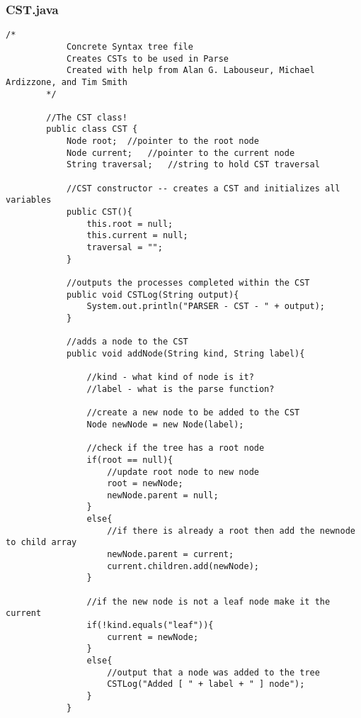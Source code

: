 \documentclass[letterpaper, 10pt,DIV=13]{scrartcl}
\numberwithin{equation}{section} %
\numberwithin{figure}{section} %
\numberwithin{table}{section} %
\begin{document}
    \subsubsection*{CST.java}
    \lstset{numbers=left, numberstyle=\tiny, stepnumber=1, numbersep=5pt, basicstyle=\footnotesize\ttfamily}
    \begin{lstlisting}[frame=single, ]
        /*
            Concrete Syntax tree file
            Creates CSTs to be used in Parse
            Created with help from Alan G. Labouseur, Michael Ardizzone, and Tim Smith
        */
        
        //The CST class!
        public class CST {
            Node root;  //pointer to the root node
            Node current;   //pointer to the current node
            String traversal;   //string to hold CST traversal
        
            //CST constructor -- creates a CST and initializes all variables
            public CST(){
                this.root = null;
                this.current = null;
                traversal = "";
            }
        
            //outputs the processes completed within the CST
            public void CSTLog(String output){
                System.out.println("PARSER - CST - " + output);
            }
        
            //adds a node to the CST
            public void addNode(String kind, String label){
        
                //kind - what kind of node is it?
                //label - what is the parse function?
        
                //create a new node to be added to the CST
                Node newNode = new Node(label);
        
                //check if the tree has a root node
                if(root == null){
                    //update root node to new node
                    root = newNode;
                    newNode.parent = null;
                }
                else{
                    //if there is already a root then add the newnode to child array
                    newNode.parent = current;
                    current.children.add(newNode);
                }
        
                //if the new node is not a leaf node make it the current
                if(!kind.equals("leaf")){
                    current = newNode;
                }
                else{
                    //output that a node was added to the tree
                    CSTLog("Added [ " + label + " ] node");
                }
            }
        

\end{lstlisting}
\end{document}
